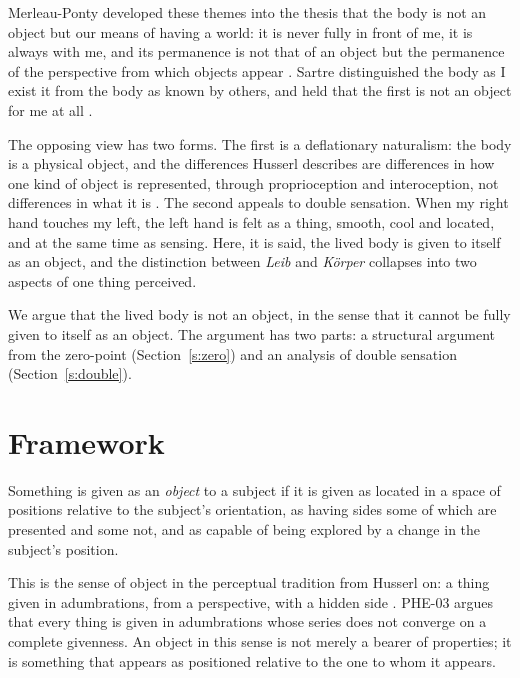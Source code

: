 \documentclass{situationist-preprint}
\begin{document}
Merleau-Ponty developed these themes into the thesis that the body is not an object but our means of having a world: it is never fully in front of me, it is always with me, and its permanence is not that of an object but the permanence of the perspective from which objects appear \citep{MerleauPonty1945}. Sartre distinguished the body as I exist it from the body as known by others, and held that the first is not an object for me at all \citep[Part~III, ch.~2]{Sartre1943}.

The opposing view has two forms. The first is a deflationary naturalism: the body is a physical object, and the differences Husserl describes are differences in how one kind of object is represented, through proprioception and interoception, not differences in what it is \citep{Bermudez1998,deVignemont2018}. The second appeals to double sensation. When my right hand touches my left, the left hand is felt as a thing, smooth, cool and located, and at the same time as sensing. Here, it is said, the lived body is given to itself as an object, and the distinction between \emph{Leib} and \emph{K\"orper} collapses into two aspects of one thing perceived.

We argue that the lived body is not an object, in the sense that it cannot be fully given to itself as an object. The argument has two parts: a structural argument from the zero-point (Section~\ref{s:zero}) and an analysis of double sensation (Section~\ref{s:double}).

\section{Framework}

\begin{definition}[Object]\label{d:obj}
Something is given as an \emph{object} to a subject if it is given as located in a space of positions relative to the subject's orientation, as having sides some of which are presented and some not, and as capable of being explored by a change in the subject's position.
\end{definition}

This is the sense of object in the perceptual tradition from Husserl on: a thing given in adumbrations, from a perspective, with a hidden side \citep[\S\S18, 41]{Husserl1952}. PHE-03 argues that every thing is given in adumbrations whose series does not converge on a complete givenness. An object in this sense is not merely a bearer of properties; it is something that appears as positioned relative to the one to whom it appears.
\end{document}
